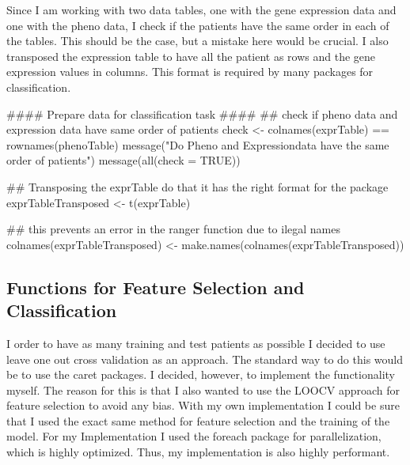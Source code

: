\documentclass[]{article}
\newenvironment{Shaded}{\begin{snugshade}}{\end{snugshade}}
\newcommand{\CommentTok}[1]{\textcolor[rgb]{0.50,0.62,0.50}{#1}}
\newcommand{\DataTypeTok}[1]{\textcolor[rgb]{0.87,0.87,0.75}{#1}}
\newcommand{\KeywordTok}[1]{\textcolor[rgb]{0.94,0.87,0.69}{#1}}
\newcommand{\NormalTok}[1]{\textcolor[rgb]{0.80,0.80,0.80}{#1}}
\newcommand{\OperatorTok}[1]{\textcolor[rgb]{0.94,0.94,0.82}{#1}}
\newcommand{\OtherTok}[1]{\textcolor[rgb]{0.94,0.94,0.56}{#1}}
\newcommand{\StringTok}[1]{\textcolor[rgb]{0.80,0.58,0.58}{#1}}
\begin{document}
Since I am working with two data tables, one with the gene expression
data and one with the pheno data, I check if the patients have the same
order in each of the tables. This should be the case, but a mistake here
would be crucial. I also transposed the expression table to have all the
patient as rows and the gene expression values in columns. This format
is required by many packages for classification.

\begin{Shaded}
\begin{Highlighting}[]
\CommentTok{#### Prepare data for classification task ####}
\CommentTok{## check if pheno data and expression data have same order of patients}
\NormalTok{check <-}\StringTok{ }\KeywordTok{colnames}\NormalTok{(exprTable) }\OperatorTok{==}\StringTok{ }\KeywordTok{rownames}\NormalTok{(phenoTable)}
\KeywordTok{message}\NormalTok{(}\StringTok{"Do Pheno and Expressiondata have the same order of patients"}\NormalTok{)}
\KeywordTok{message}\NormalTok{(}\KeywordTok{all}\NormalTok{(}\DataTypeTok{check =} \OtherTok{TRUE}\NormalTok{))}

\CommentTok{## Transposing the exprTable do that it has the right format for the package}
\NormalTok{exprTableTransposed <-}\StringTok{ }\KeywordTok{t}\NormalTok{(exprTable)}

\CommentTok{## this prevents an error in the ranger function due to ilegal names}
\KeywordTok{colnames}\NormalTok{(exprTableTransposed) <-}\StringTok{ }\KeywordTok{make.names}\NormalTok{(}\KeywordTok{colnames}\NormalTok{(exprTableTransposed))}
\end{Highlighting}
\end{Shaded}

\hypertarget{functions-for-feature-selection-and-classification}{%
\subsection{Functions for Feature Selection and
Classification}\label{functions-for-feature-selection-and-classification}}

I order to have as many training and test patients as possible I decided
to use leave one out cross validation as an approach. The standard way
to do this would be to use the caret packages. I decided, however, to
implement the functionality myself. The reason for this is that I also
wanted to use the LOOCV approach for feature selection to avoid any
bias. With my own implementation I could be sure that I used the exact
same method for feature selection and the training of the model. For my
Implementation I used the foreach package for parallelization, which is
highly optimized. Thus, my implementation is also highly performant.
\end{document}
